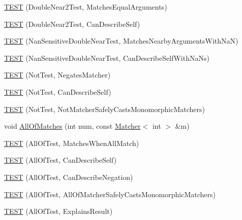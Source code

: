 \begin{DoxyCompactItemize}
\item 
\mbox{\hyperlink{namespacetesting_1_1gmock__matchers__test_aa7589c5d34e5aae4031e5e0fac29c9f5}{T\+E\+ST}} (Double\+Near2\+Test, Matches\+Equal\+Arguments)
\item 
\mbox{\hyperlink{namespacetesting_1_1gmock__matchers__test_a6f3834a4f5028027db270e7f3e0052f6}{T\+E\+ST}} (Double\+Near2\+Test, Can\+Describe\+Self)
\item 
\mbox{\hyperlink{namespacetesting_1_1gmock__matchers__test_a29c16f71a512c1f7906f54167c6bd6ab}{T\+E\+ST}} (Nan\+Sensitive\+Double\+Near\+Test, Matches\+Nearby\+Arguments\+With\+NaN)
\item 
\mbox{\hyperlink{namespacetesting_1_1gmock__matchers__test_a873b74c264015e8e2bb1a1f693f4cf88}{T\+E\+ST}} (Nan\+Sensitive\+Double\+Near\+Test, Can\+Describe\+Self\+With\+Na\+Ns)
\item 
\mbox{\hyperlink{namespacetesting_1_1gmock__matchers__test_ab41b57eeaea5568064b6ed3725316c73}{T\+E\+ST}} (Not\+Test, Negates\+Matcher)
\item 
\mbox{\hyperlink{namespacetesting_1_1gmock__matchers__test_a831db2bf90c3950953cdceaefebddd40}{T\+E\+ST}} (Not\+Test, Can\+Describe\+Self)
\item 
\mbox{\hyperlink{namespacetesting_1_1gmock__matchers__test_a46849e0c019e331f830ed91137fa417a}{T\+E\+ST}} (Not\+Test, Not\+Matcher\+Safely\+Casts\+Monomorphic\+Matchers)
\item 
void \mbox{\hyperlink{namespacetesting_1_1gmock__matchers__test_a51d8731c3824a6acdaa594645dd46779}{All\+Of\+Matches}} (int num, const \mbox{\hyperlink{classtesting_1_1_matcher}{Matcher}}$<$ int $>$ \&m)
\item 
\mbox{\hyperlink{namespacetesting_1_1gmock__matchers__test_a7714d041eb2dd2e233db7f175fedef5a}{T\+E\+ST}} (All\+Of\+Test, Matches\+When\+All\+Match)
\item 
\mbox{\hyperlink{namespacetesting_1_1gmock__matchers__test_a31056975d89eea2786997cf18b086bf4}{T\+E\+ST}} (All\+Of\+Test, Can\+Describe\+Self)
\item 
\mbox{\hyperlink{namespacetesting_1_1gmock__matchers__test_a86c15b3bc163321c7a56aeb0b1709b87}{T\+E\+ST}} (All\+Of\+Test, Can\+Describe\+Negation)
\item 
\mbox{\hyperlink{namespacetesting_1_1gmock__matchers__test_a4196a4000390e2378954d55b4f6d2893}{T\+E\+ST}} (All\+Of\+Test, All\+Of\+Matcher\+Safely\+Casts\+Monomorphic\+Matchers)
\item 
\mbox{\hyperlink{namespacetesting_1_1gmock__matchers__test_a2b9f4a791dd4f1fb9f8a1400883a5db4}{T\+E\+ST}} (All\+Of\+Test, Explains\+Result)

\end{DoxyCompactItemize}
